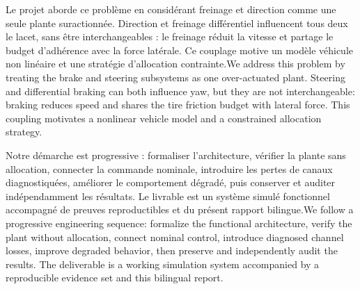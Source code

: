 \documentclass[11pt,a4paper,oneside]{report}
\newcommand{\bi}[2]{\iffrench #2\else #1\fi}
\begin{document}
\bi{We address this problem by treating the brake and steering subsystems as one over-actuated plant. Steering and differential braking can both influence yaw, but they are not interchangeable: braking reduces speed and shares the tire friction budget with lateral force. This coupling motivates a nonlinear vehicle model and a constrained allocation strategy.}{Le projet aborde ce problème en considérant freinage et direction comme une seule plante suractionnée. Direction et freinage différentiel influencent tous deux le lacet, sans être interchangeables : le freinage réduit la vitesse et partage le budget d'adhérence avec la force latérale. Ce couplage motive un modèle véhicule non linéaire et une stratégie d'allocation contrainte.}

\bi{We follow a progressive engineering sequence: formalize the functional architecture, verify the plant without allocation, connect nominal control, introduce diagnosed channel losses, improve degraded behavior, then preserve and independently audit the results. The deliverable is a working simulation system accompanied by a reproducible evidence set and this bilingual report.}{Notre démarche est progressive : formaliser l'architecture, vérifier la plante sans allocation, connecter la commande nominale, introduire les pertes de canaux diagnostiquées, améliorer le comportement dégradé, puis conserver et auditer indépendamment les résultats. Le livrable est un système simulé fonctionnel accompagné de preuves reproductibles et du présent rapport bilingue.}
\end{document}

